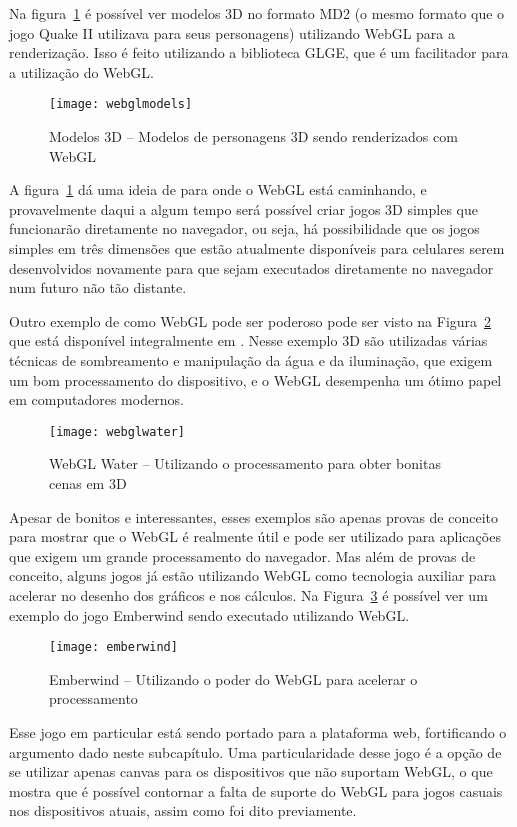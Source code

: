 Na figura~\ref{img:webglmodels} é possível ver modelos 3D no formato
MD2 (o mesmo formato que o jogo Quake II utilizava para seus
personagens) utilizando WebGL para a renderização. Isso é feito utilizando a
biblioteca GLGE, que é um facilitador para a utilização do WebGL.

\begin{figure}[H]
  \centering
	\texttt{[image: webglmodels]}
  \caption{Modelos 3D {--} Modelos de personagens 3D sendo renderizados com WebGL}
  \label{img:webglmodels}
\end{figure}

A figura~\ref{img:webglmodels} dá uma ideia de para onde o WebGL está
caminhando, e provavelmente daqui a algum tempo será possível criar
jogos 3D simples que funcionarão diretamente no navegador, ou seja, há
possibilidade que os jogos simples em três dimensões que estão atualmente
disponíveis para celulares serem desenvolvidos novamente para que
sejam executados diretamente no navegador num futuro não tão distante.

Outro exemplo de como WebGL pode ser poderoso pode ser visto na Figura~\ref{img:webglwater}
que está disponível integralmente em .
Nesse exemplo 3D são utilizadas várias técnicas de sombreamento e
manipulação da água e da iluminação, que exigem um bom processamento
do dispositivo, e o WebGL desempenha um ótimo papel em computadores
modernos.

\begin{figure}[H]
  \centering
	\texttt{[image: webglwater]}
  \caption{WebGL Water {--} Utilizando o processamento para obter
  bonitas cenas em 3D}
  \label{img:webglwater}
\end{figure}

Apesar de bonitos e interessantes, esses exemplos são apenas provas de
conceito para mostrar que o WebGL é realmente útil e pode ser
utilizado para aplicações que exigem um grande processamento do
navegador. Mas além de provas de conceito, alguns jogos já estão
utilizando WebGL como tecnologia auxiliar para acelerar no desenho dos
gráficos e nos cálculos.
Na Figura~\ref{img:emberwind} é possível ver um exemplo do jogo Emberwind
sendo executado utilizando WebGL.

\begin{figure}[H]
  \centering
	\texttt{[image: emberwind]}
  \caption{Emberwind {--} Utilizando o poder do WebGL para acelerar o processamento}
  \label{img:emberwind}
\end{figure}

Esse jogo em particular está sendo portado para a plataforma web,
fortificando o argumento dado neste subcapítulo. Uma particularidade
desse jogo é a opção de se utilizar apenas canvas para os dispositivos
que não suportam WebGL, o que mostra que é possível contornar a falta
de suporte do WebGL para jogos casuais nos dispositivos atuais, assim
como foi dito previamente.

\clearpage
